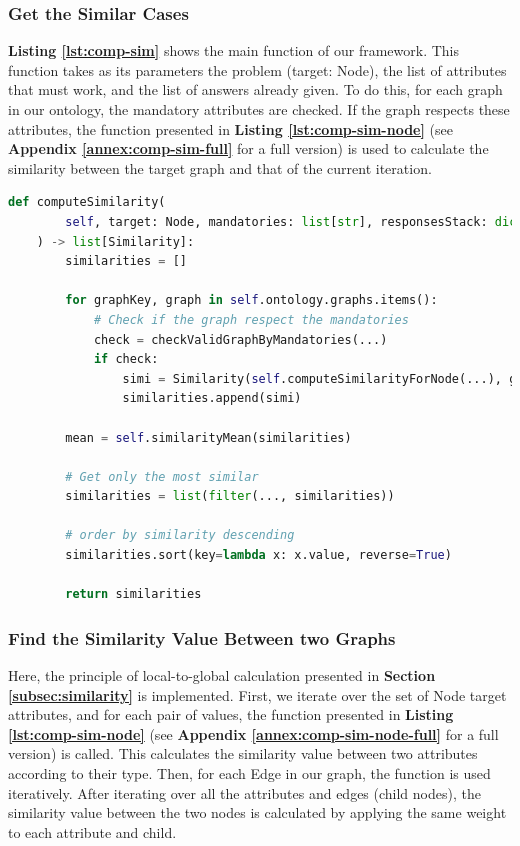 \subsubsection{Get the Similar Cases}
\textbf{Listing \ref{lst:comp-sim}} shows the main function of our framework. This function takes as its parameters the problem (target: Node), the list of attributes that must work, and the list of answers already given. To do this, for each graph in our ontology, the mandatory attributes are checked. If the graph respects these attributes, the function presented in \textbf{Listing \ref{lst:comp-sim-node}} (see \textbf{Appendix \ref{annex:comp-sim-full}} for a full version) is used to calculate the similarity between the target graph and that of the current iteration.\\


\begin{lstlisting}[language=Python, caption=Function to Find the Similarity Between One Case and All the Cases in the Data-Base, label={lst:comp-sim}]
def computeSimilarity(
        self, target: Node, mandatories: list[str], responsesStack: dict[str, Any]
    ) -> list[Similarity]:
        similarities = []

        for graphKey, graph in self.ontology.graphs.items():
            # Check if the graph respect the mandatories
            check = checkValidGraphByMandatories(...)
            if check:
                simi = Similarity(self.computeSimilarityForNode(...), graph)
                similarities.append(simi)

        mean = self.similarityMean(similarities)

        # Get only the most similar
        similarities = list(filter(..., similarities))

        # order by similarity descending
        similarities.sort(key=lambda x: x.value, reverse=True)

        return similarities
\end{lstlisting}
    
    
    
\subsubsection{Find the Similarity Value Between two Graphs} 
Here, the principle of local-to-global calculation presented in \textbf{Section \ref{subsec:similarity}} is implemented. First, we iterate over the set of Node target attributes, and for each pair of values, the function presented in \textbf{Listing \ref{lst:comp-sim-node}} (see \textbf{Appendix \ref{annex:comp-sim-node-full}} for a full version) is called. This calculates the similarity value between two attributes according to their type. Then, for each Edge in our graph, the function is used iteratively.
After iterating over all the attributes and edges (child nodes), the similarity value between the two nodes is calculated by applying the same weight to each attribute and child.\\

